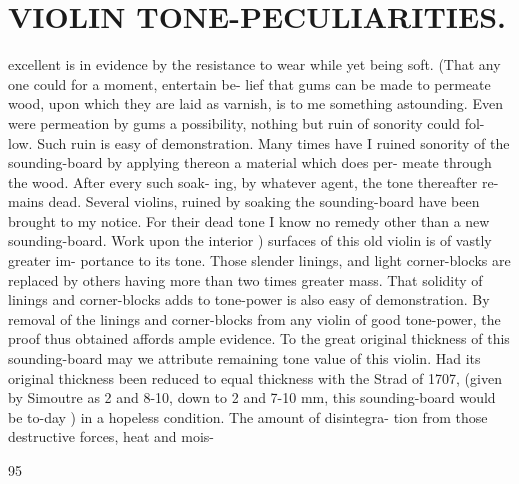 \documentclass{article}
\begin{document}
\section*{VIOLIN TONE-PECULIARITIES.}
excellent is in evidence by the resistance to wear while yet being soft. (That any one could for a moment, entertain be- lief that gums can be made to permeate wood, upon which they are laid as varnish, is to me something astounding. Even were permeation by gums a possibility, nothing but ruin of sonority could fol- low. Such ruin is easy of demonstration. Many times have I ruined sonority of the sounding-board by applying thereon a material which does per- meate through the wood. After every such soak- ing, by whatever agent, the tone thereafter re- mains dead. Several violins, ruined by soaking the sounding-board have been brought to my notice. For their dead tone I know no remedy other than a new sounding-board. Work upon the interior ) surfaces of this old violin is of vastly greater im- portance to its tone. Those slender linings, and light corner-blocks are replaced by others having more than two times greater mass. That solidity of linings and corner-blocks adds to tone-power is also easy of demonstration. By removal of the linings and corner-blocks from any violin of good tone-power, the proof thus obtained affords ample evidence. To the great original thickness of this sounding-board may we attribute remaining tone value of this violin. Had its original thickness been reduced to equal thickness with the Strad of 1707, (given by Simoutre as 2 and 8-10, down to 2 and 7-10 mm, this sounding-board would be to-day ) in a hopeless condition. The amount of disintegra- tion from those destructive forces, heat and mois-

95
\end{document}
